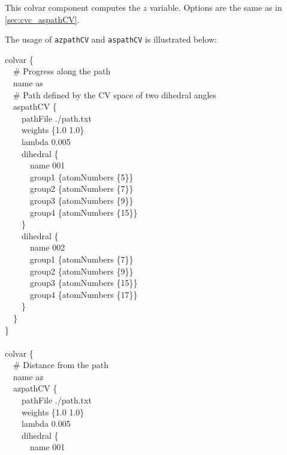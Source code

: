 
This colvar component computes the $z$ variable. Options are the same as in \ref{sec:cvc_aspathCV}.

The usage of \texttt{azpathCV} and \texttt{aspathCV} is illustrated below:

\begin{cvexampleinput}
colvar \{\\
\-~~\# Progress along the path\\
\-~~name as\\
\-~~\# Path defined by the CV space of two dihedral angles\\
\-~~aspathCV \{\\
\-~~~~pathFile ./path.txt\\
\-~~~~weights \{1.0 1.0\}\\
\-~~~~lambda 0.005\\
\-~~~~dihedral \{\\
\-~~~~~~name 001\\
\-~~~~~~group1 \{atomNumbers \{5\}\}\\
\-~~~~~~group2 \{atomNumbers \{7\}\}\\
\-~~~~~~group3 \{atomNumbers \{9\}\}\\
\-~~~~~~group4 \{atomNumbers \{15\}\}\\
\-~~~~\}\\
\-~~~~dihedral \{\\
\-~~~~~~name 002\\
\-~~~~~~group1 \{atomNumbers \{7\}\}\\
\-~~~~~~group2 \{atomNumbers \{9\}\}\\
\-~~~~~~group3 \{atomNumbers \{15\}\}\\
\-~~~~~~group4 \{atomNumbers \{17\}\}\\
\-~~~~\}\\
\-~~\}\\
\}\\
\\
colvar \{\\
\-~~\# Distance from the path\\
\-~~name az\\
\-~~azpathCV \{\\
\-~~~~pathFile ./path.txt\\
\-~~~~weights \{1.0 1.0\}\\
\-~~~~lambda 0.005\\
\-~~~~dihedral \{\\
\-~~~~~~name 001\\

\end{cvexampleinput}
